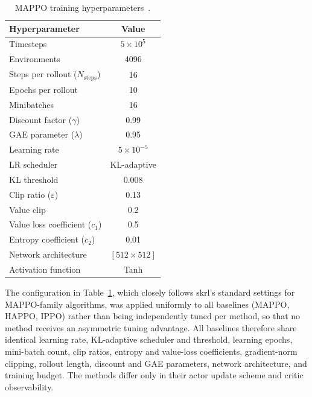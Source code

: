 \begin{table}[htbp]
\centering
\caption{MAPPO training hyperparameters~\citep{sk2026priorguided}.}
\label{tab:alpha_hyper}
\begin{tabular}{lc}
\toprule
\textbf{Hyperparameter} & \textbf{Value} \\
\midrule
Timesteps              & $5 \times 10^5$ \\
Environments             & 4096 \\
Steps per rollout ($N_{\text{steps}}$) & 16 \\
Epochs per rollout        & 10 \\
Minibatches                & 16 \\
Discount factor ($\gamma$)  & 0.99 \\
GAE parameter ($\lambda$)    & 0.95 \\
Learning rate                  & $5 \times 10^{-5}$ \\
LR scheduler                     & KL-adaptive \\
KL threshold                       & 0.008 \\
Clip ratio ($\varepsilon$)              & 0.13 \\
Value clip                            & 0.2 \\
Value loss coefficient ($c_1$)          & 0.5 \\
Entropy coefficient ($c_2$)              & 0.01 \\
Network architecture                       & $[512 \times 512]$ \\
Activation function                          & Tanh \\
\bottomrule
\end{tabular}
\end{table}

The configuration in Table~\ref{tab:alpha_hyper}, which closely follows skrl's standard settings for
MAPPO-family algorithms, was applied uniformly to all baselines (MAPPO, HAPPO, IPPO) rather than being
independently tuned per method, so that no method receives an asymmetric tuning advantage. All
baselines therefore share identical learning rate, KL-adaptive scheduler and threshold, learning
epochs, mini-batch count, clip ratios, entropy and value-loss coefficients, gradient-norm clipping,
rollout length, discount and GAE parameters, network architecture, and training budget. The methods
differ only in their actor update scheme and critic observability.


